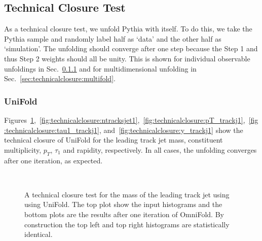 \subsection{Technical Closure Test}
\label{sec:technicalclosure}

As a technical closure test, we unfold Pythia with itself.  To do this, we take the Pythia sample and randomly label half as `data' and the other half as `simulation'.   The unfolding should converge after one step because the Step 1 and thus Step 2 weights should all be unity.  This is shown for individual observable unfoldings in Sec.~\ref{sec:technicalclosure:unifold} and for multidimensional unfolding in Sec.~\ref{sec:technicalclosure:multifold}.

\subsubsection{UniFold}
\label{sec:technicalclosure:unifold}

Figures~\ref{fig:technicalclosure:mass},~\ref{fig:technicalclosure:ntracksjet1},~\ref{fig:technicalclosure:pT_trackj1},~\ref{fig:technicalclosure:tau1_trackj1}, and~\ref{fig:technicalclosure:y_trackj1} show the technical closure of UniFold for the leading track jet mass, constituent multiplicity, $p_T$, $\tau_1$ and rapidity, respectively.  In all cases, the unfolding converges after one iteration, as expected.

\begin{figure}[h!]
\centering
{}\\
\caption{A technical closure test for the mass of the leading track jet using using UniFold.  The top plot show the input histograms and the bottom plots are the results after one iteration of OmniFold.  By construction the top left and top right histograms are statistically identical.}
\label{fig:technicalclosure:mass}
\end{figure}

